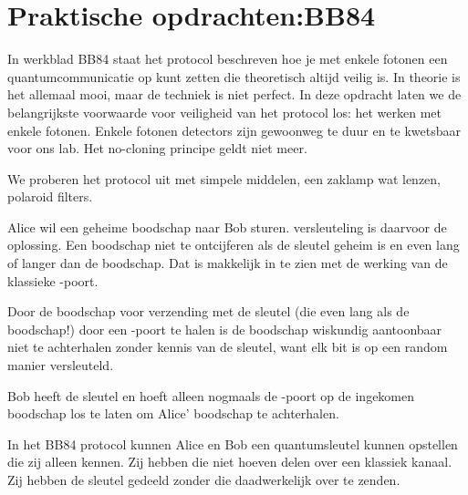 \documentclass[../main.tex]{subfiles}
\begin{document}
\onlyinsubfile{
\setcounter{chapter}{0}
}
\notinsubfile{}
\section{Praktische opdrachten:BB84}\label{sec:POBB84}


In werkblad BB84 staat het protocol beschreven hoe je met enkele fotonen een quantumcommunicatie op kunt zetten die theoretisch altijd veilig is. In theorie is het allemaal mooi, maar de techniek is niet perfect. In deze opdracht laten we de belangrijkste voorwaarde voor veiligheid van het protocol los: het werken met enkele fotonen. Enkele fotonen detectors zijn gewoonweg te duur en te kwetsbaar voor ons lab. Het no-cloning principe geldt niet meer. 

We proberen het protocol uit met simpele middelen, een zaklamp wat lenzen, polaroid filters.

Alice wil een geheime boodschap naar Bob sturen. versleuteling is daarvoor de oplossing. Een boodschap niet te ontcijferen als de sleutel geheim is en even lang of langer dan de boodschap. Dat is makkelijk in te zien met de werking van de klassieke -poort.

Door de boodschap voor verzending met de sleutel (die even lang als de boodschap!) door een -poort te halen is de boodschap wiskundig aantoonbaar niet te achterhalen zonder kennis van de sleutel, want elk bit is op een random manier versleuteld.

Bob heeft de sleutel en hoeft alleen nogmaals de -poort op de ingekomen boodschap los te laten om Alice' boodschap te achterhalen.

In het BB84 protocol kunnen Alice en Bob een quantumsleutel kunnen opstellen die zij alleen kennen. Zij hebben die niet hoeven delen over een klassiek kanaal. Zij hebben de sleutel gedeeld zonder die daadwerkelijk over te zenden.
\end{document}
